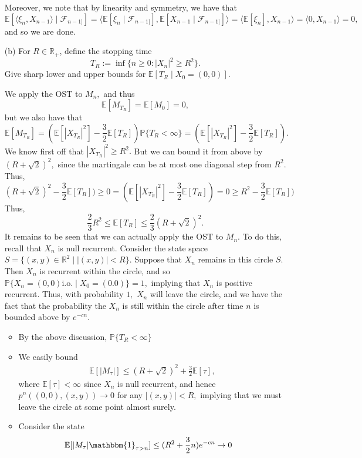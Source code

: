 \documentclass[11pt]{article}
\newcommand{\bbE}{\mathbb{E}}
\newcommand{\bbP}{\mathbb{P}}
\newcommand{\bbR}{\mathbb{R}}
\begin{document}
\begin{itemize}
\begin{solution}
Moreover, we note that by linearity and symmetry, we have that 
\[\bbE[\langle \xi_n, X_{n-1} \rangle  \mid \mathcal{F}_{n-1]}]= \langle \bbE[\xi_n\mid \mathcal{F}_{n-1]}], \bbE[X_{n-1}\mid \mathcal{F}_{n-1]}]\rangle = \langle \bbE[\xi_n], X_{n-1}\rangle = \langle 0, X_{n-1}\rangle = 0,\]and so we are done.
    \end{solution}


    
    \item[(b)] For \(R \in \mathbb{R}_+\), define the stopping time
    \[
    T_R := \inf\{n \geq 0 : |X_n|^2 \geq R^2\}.
    \]
    Give sharp lower and upper bounds for \(\mathbb{E}[T_R \mid X_0 = (0, 0)]\).
\begin{solution}
    We apply the OST to $M_n,$ and thus 
    \[\bbE[M_{T_R}] = \bbE[M_0] = 0,\] but we also have that 
    \[\bbE[M_{T_R}] = (\bbE[|X_{T_R}|^2]-\frac{3}{2}\bbE[T_R])\bbP\{T_R < \infty\} = (\bbE[|X_{T_R}|^2]-\frac{3}{2}\bbE[T_R]).\] We know first off that $|X_{T_R}|^2 \geq R^2.$ But we can bound it from above by $(R + \sqrt{2})^2 ,$ since the martingale can be at most one diagonal step from $R^2.$ Thus, 
    \[(R + \sqrt{2})^2 - \frac{3}{2}\bbE[T_R]) \geq 0 = (\bbE[|X_{T_R}|^2]-\frac{3}{2}\bbE[T_R])  = 0\geq R^2 - \frac{3}{2}\bbE[T_R])\] Thus, 
    \[\frac{2}{3}R^2 \leq \bbE[T_R] \leq \frac{2}{3}(R + \sqrt{2})^2.\] It remains to be seen that we can actually apply the OST to $M_n.$ To do this, recall that $X_n$ is null recurrent. Consider the state space $S = \{(x,y)\in \bbR^2 \mid |(x,y)|< R\}.$ Suppose that $X_n$ remains in this circle $S.$ Then $X_n$ is recurrent within the circle, and so $\bbP\{X_n = (0,0) \text{i.o.} \mid X_0 = (0.0)\} = 1,$ implying that $X_n$ is positive recurrent. Thus, with probability $1,$ $X_n$ will leave the circle, and we have the fact that the probability the $X_n$ is still within the circle after time $n$ is bounded above by $e^{-cn}.$
    \begin{itemize}
        \item By the above discussion, $\bbP\{T_R < \infty\}$
        \item We easily bound 
        \begin{align*}
            \bbE[|M_\tau|] \leq (R + \sqrt{2})^2 + \frac{3}{2}\bbE[\tau],
        \end{align*} where $\bbE[\tau]< \infty$ since $X_n$ is null recurrent, and hence $p^n((0,0), (x,y)) \to 0$ for any $|(x,y)|< R,$ implying that we must leave the circle at some point almost surely. 
        \item Consider the state
        \begin{align*}
\bbE[|M_\tau|\mathbbm{1}_{\tau >n}] &\leq (R^2 + \frac{3}{2}n)e^{-cn}\to 0
        \end{align*}
    \end{itemize}
\end{solution}
\end{itemize}
\end{document}

